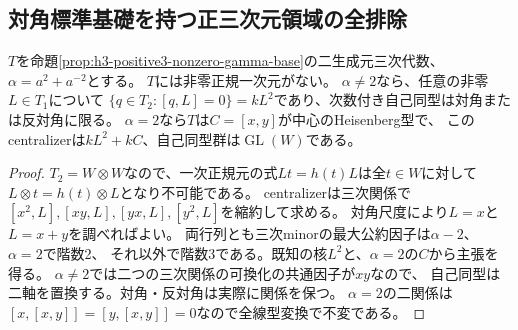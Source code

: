 \subsection{対角標準基礎を持つ正三次元領域の全排除}
\label{subsec:h3-positive3-diagonal-monic}
\begin{lemma}\label{lem:h3-positive3-cubic-centralizers}
$T$を命題\ref{prop:h3-positive3-nonzero-gamma-base}の二生成元三次代数、
$\alpha=a^2+a^{-2}$とする。
$T$には非零正規一次元がない。
$\alpha\ne2$なら、任意の非零$L\in T_1$について
$\{q\in T_2:[q,L]=0\}=kL^2$であり、次数付き自己同型は対角または反対角に限る。
$\alpha=2$なら$T$は$C=[x,y]$が中心のHeisenberg型で、
このcentralizerは$kL^2+kC$、自己同型群は$\operatorname{GL}(W)$である。
\end{lemma}
\begin{proof}
$T_2=W\otimes W$なので、一次正規元の式$Lt=h(t)L$は全$t\in W$に対して
$L\otimes t=h(t)\otimes L$となり不可能である。
centralizerは三次関係で$[x^2,L],[xy,L],[yx,L],[y^2,L]$を縮約して求める。
対角尺度により$L=x$と$L=x+y$を調べればよい。
両行列とも三次minorの最大公約因子は$\alpha-2$、$\alpha=2$で階数2、
それ以外で階数3である。既知の核$L^2$と、$\alpha=2$の$C$から主張を得る。
$\alpha\ne2$では二つの三次関係の可換化の共通因子が$xy$なので、
自己同型は二軸を置換する。対角・反対角は実際に関係を保つ。
$\alpha=2$の二関係は$[x,[x,y]]=[y,[x,y]]=0$なので全線型変換で不変である。
\end{proof}

